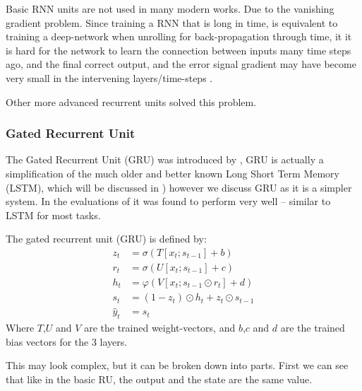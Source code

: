 \documentclass[12pt,parskip]{komatufte}
\begin{document}
Basic RNN units are not used in many modern works.
Due to the vanishing gradient problem. 
Since training a RNN that is long in time, is equivalent to training a deep-network when unrolling for back-propagation through time,
it it is hard for the network to learn the connection between inputs many time steps ago, and the final correct output, and the error signal gradient may have become very small in the intervening layers/time-steps .

Other more advanced recurrent units solved this problem.

\subsubsection{Gated Recurrent Unit}
The Gated Recurrent Unit (GRU) was introduced by ,
GRU is actually a simplification of the much older and better known Long Short Term Memory (LSTM),
 which will be discussed in ) however we discuss GRU as it is a simpler system.
In the evaluations of   it was found to perform very well -- similar to LSTM for most tasks.


The gated recurrent unit (GRU) is defined by:
\begin{align}
z_t &= \sigma \left( T[x_t; s_{t-1}] + b \right) \\
r_t &= \sigma \left( U[x_t; s_{t-1}] + c \right) \\
%
h_t &= \varphi \left( V[x_t; s_{t-1} \odot r_t] + d \right)  \\
s_t &= (1-z_t) \odot h_t + z_t\odot s_{t-1}\\
\hat{y}_t &= s_t
\end{align}
Where $T$,$U$ and $V$ are the trained weight-vectors, and $b$,$c$ and $d$ are the trained bias vectors for the 3 layers.


This may look complex, but it can be broken down into parts.
First we can see that like in the basic RU, the output and the state are the same value.
\end{document}
